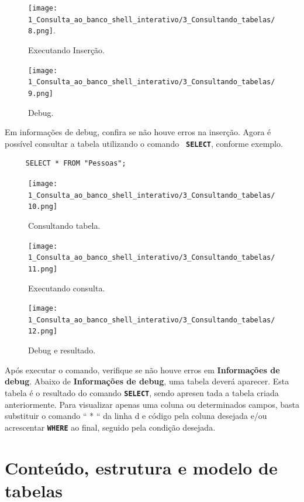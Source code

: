 \documentclass[9pt]{report}
\begin{document}
{   \begin{figure}[H]
      \texttt{[image: 1\_Consulta\_ao\_banco\_shell\_interativo/3\_Consultando\_tabelas/8.png]}.      
      \caption{Executando Inserção.}
      \label{fig:executarIn}
   \end{figure}

   \begin{figure}[H]
     \texttt{[image: 1\_Consulta\_ao\_banco\_shell\_interativo/3\_Consultando\_tabelas/9.png]}     
     \caption{Debug.}
     \label{fig:debugInsercao}
   \end{figure}

   Em informações de debug, confira se não houve erros na inserção.
   Agora é possível consultar a tabela utilizando o comando
   \texttt{\textbf{ SELECT}}, conforme exemplo.
   \\
   \begin{lstlisting}
     SELECT * FROM "Pessoas";
   \end{lstlisting}
  
  \begin{figure}[H]
     \texttt{[image: 1\_Consulta\_ao\_banco\_shell\_interativo/3\_Consultando\_tabelas/10.png]}     
     \caption{Consultando tabela.}
     \label{fig:select1}
   \end{figure}

   \begin{figure}[H]
     \texttt{[image: 1\_Consulta\_ao\_banco\_shell\_interativo/3\_Consultando\_tabelas/11.png]}    
     \caption{Executando consulta.}
     \label{fig:execons}
   \end{figure}

    \begin{figure}[H]
     \texttt{[image: 1\_Consulta\_ao\_banco\_shell\_interativo/3\_Consultando\_tabelas/12.png]}     
     \caption{Debug e resultado.}
     \label{fig:select2}
    \end{figure}

    Após executar o comando, verifique se não houve erros em
    \textbf{Informações de debug}. Abaixo de \textbf{Informações de
     debug}, uma tabela deverá aparecer. Esta tabela é o resultado do
    comando \texttt{\textbf{SELECT}}, sendo apresen tada a tabela
    criada anteriormente. Para visualizar apenas uma coluna ou
    determinados campos, basta substituir o comando “ * “ da linha d
    e código pela coluna desejada e/ou acrescentar
    \texttt{\textbf{WHERE}} ao final, seguido pela condição desejada.
    
    \section{Conteúdo, estrutura e modelo de tabelas}
    
}
\end{document}
